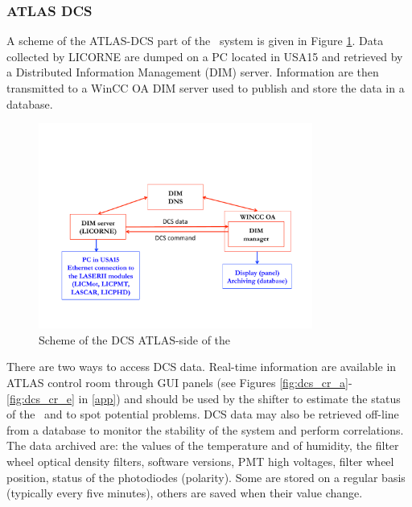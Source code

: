 \subsubsection{ATLAS DCS}

A scheme of the ATLAS-DCS part of the \las~system is given in Figure \ref{fig:lasdcs}. Data collected by LICORNE are dumped on a PC located in USA15 and retrieved by a Distributed Information Management (DIM) \cite{ref:dim} server. Information are then transmitted to a WinCC OA \cite{ref:winccoa} DIM server used to publish and store the data in a database.

\begin{figure}[htbp]
\centering
\includegraphics[width=9cm]{figures/LaserII_DCS.pdf}
\caption{Scheme of the DCS ATLAS-side of the \las}\label{fig:lasdcs}
\end{figure}

There are two ways to access DCS data. Real-time information are available in ATLAS control room through GUI panels (see Figures \ref{fig:dcs_cr_a}-\ref{fig:dcs_cr_e} in \ref{app}) and should be used by the shifter to estimate the status of the \laser~and to spot potential problems. DCS data may also be retrieved off-line from a database to monitor the stability of the system and perform correlations. The data archived are: the values of the temperature and of humidity, the filter wheel optical density filters, software versions, PMT high voltages, filter wheel position, status of the photodiodes (polarity). Some are stored on a regular basis (typically every five minutes), others are saved when their value change. 